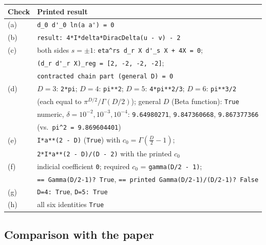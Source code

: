 \begin{center}\small
\renewcommand{\arraystretch}{1.15}
\begin{tabular}{lp{}}
\toprule
Check & Printed result\\
\midrule
(a) & \verb|d_0 d'_0 ln(a a') = 0|\\
(b) & \verb|result: 4*I*delta*DiracDelta(u - v) - 2|\\
(c) & both sides $s=\pm1$: \verb|eta^rs d_r X d'_s X + 4X = 0|;\\
    & \verb|(d_r d'_r X)_reg = [2, -2, -2, -2]|;\\
    & \verb|contracted chain part (general D) = 0|\\
(d) & $D=3$: \verb|2*pi|; $D=4$: \verb|pi**2|; $D=5$: \verb|4*pi**2/3|; $D=6$: \verb|pi**3/2|\\
    & (each equal to $\pi^{D/2}/\Gamma(D/2)$); general $D$ (Beta function): \verb|True|\\
    & numeric, $\delta=10^{-2},10^{-3},10^{-4}$: \verb|9.64980271|, \verb|9.847360668|, \verb|9.867377366|\\
    & (vs.\ \verb|pi^2 = 9.869604401|)\\
(e) & \verb|I*a**(2 - D)| (\verb|True|) with $c_0=\Gamma(\tfrac D2-1)$;\\
    & \verb|2*I*a**(2 - D)/(D - 2)| with the printed $c_0$\\
(f) & indicial coefficient \verb|0|; required $c_0$ = \verb|gamma(D/2 - 1)|;\\
    & \verb|== Gamma(D/2-1)? True|, \verb|== printed Gamma(D/2-1)/(D/2-1)? False|\\
(g) & \verb|D=4: True|, \verb|D=5: True|\\
(h) & all six identities \verb|True|\\
\bottomrule
\end{tabular}
\end{center}

\subsection{Comparison with the paper}
\label{sec:ch3-t8-compare}

